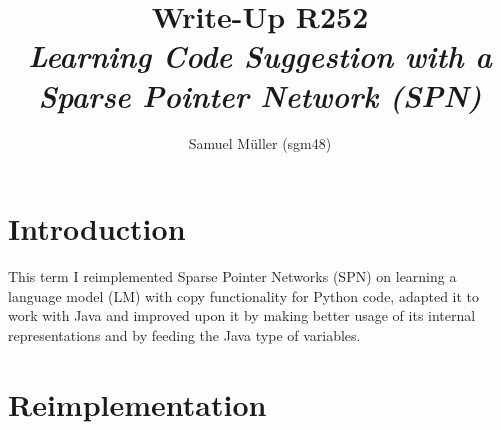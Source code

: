 \documentclass[11pt]{article}
\begin{document}


\newcommand{\ggg}[1]{\textcolor{gray}{#1}}
\newcommand{\lmatt}{LMAtt\xspace}
\newcommand{\spn}{SPN\xspace}

\title{%
Write-Up R252\\[1mm]
\large \textit{Learning Code Suggestion with a Sparse Pointer Network (SPN)}
}
\author{Samuel Müller (sgm48)}
\maketitle

\section{Introduction}
This term I reimplemented Sparse Pointer Networks (SPN) \citep{bhoopchand2016learning} on learning a language model (LM) with copy functionality for Python code, adapted it to work with Java and improved upon it by making better usage of its internal representations and by feeding the Java type of variables.
\section{Reimplementation}
\label{reimplementation}
\end{document}
